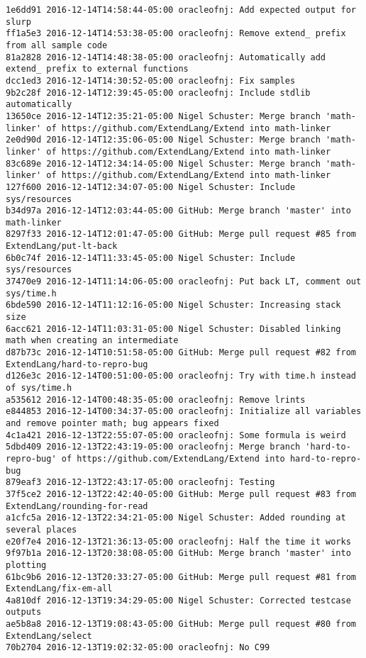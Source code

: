 \begin{lstlisting}
1e6dd91 2016-12-14T14:58:44-05:00 oracleofnj: Add expected output for slurp
ff1a5e3 2016-12-14T14:53:38-05:00 oracleofnj: Remove extend_ prefix from all sample code
81a2828 2016-12-14T14:48:38-05:00 oracleofnj: Automatically add extend_ prefix to external functions
dcc1ed3 2016-12-14T14:30:52-05:00 oracleofnj: Fix samples
9b2c28f 2016-12-14T12:39:45-05:00 oracleofnj: Include stdlib automatically
13650ce 2016-12-14T12:35:21-05:00 Nigel Schuster: Merge branch 'math-linker' of https://github.com/ExtendLang/Extend into math-linker
2e0d90d 2016-12-14T12:35:06-05:00 Nigel Schuster: Merge branch 'math-linker' of https://github.com/ExtendLang/Extend into math-linker
83c689e 2016-12-14T12:34:14-05:00 Nigel Schuster: Merge branch 'math-linker' of https://github.com/ExtendLang/Extend into math-linker
127f600 2016-12-14T12:34:07-05:00 Nigel Schuster: Include sys/resources
b34d97a 2016-12-14T12:03:44-05:00 GitHub: Merge branch 'master' into math-linker
8297f33 2016-12-14T12:01:47-05:00 GitHub: Merge pull request #85 from ExtendLang/put-lt-back
6b0c74f 2016-12-14T11:33:45-05:00 Nigel Schuster: Include sys/resources
37470e9 2016-12-14T11:14:06-05:00 oracleofnj: Put back LT, comment out sys/time.h
6bde590 2016-12-14T11:12:16-05:00 Nigel Schuster: Increasing stack size
6acc621 2016-12-14T11:03:31-05:00 Nigel Schuster: Disabled linking math when creating an intermediate
d87b73c 2016-12-14T10:51:58-05:00 GitHub: Merge pull request #82 from ExtendLang/hard-to-repro-bug
d126e3c 2016-12-14T00:51:00-05:00 oracleofnj: Try with time.h instead of sys/time.h
a535612 2016-12-14T00:48:35-05:00 oracleofnj: Remove lrints
e844853 2016-12-14T00:34:37-05:00 oracleofnj: Initialize all variables and remove pointer math; bug appears fixed
4c1a421 2016-12-13T22:55:07-05:00 oracleofnj: Some formula is weird
5dbd409 2016-12-13T22:43:19-05:00 oracleofnj: Merge branch 'hard-to-repro-bug' of https://github.com/ExtendLang/Extend into hard-to-repro-bug
879eaf3 2016-12-13T22:43:17-05:00 oracleofnj: Testing
37f5ce2 2016-12-13T22:42:40-05:00 GitHub: Merge pull request #83 from ExtendLang/rounding-for-read
a1cfc5a 2016-12-13T22:34:21-05:00 Nigel Schuster: Added rounding at several places
e20f7e4 2016-12-13T21:36:13-05:00 oracleofnj: Half the time it works
9f97b1a 2016-12-13T20:38:08-05:00 GitHub: Merge branch 'master' into plotting
61bc9b6 2016-12-13T20:33:27-05:00 GitHub: Merge pull request #81 from ExtendLang/fix-em-all
4a810df 2016-12-13T19:34:29-05:00 Nigel Schuster: Corrected testcase outputs
ae5b8a8 2016-12-13T19:08:43-05:00 GitHub: Merge pull request #80 from ExtendLang/select
70b2704 2016-12-13T19:02:32-05:00 oracleofnj: No C99

\end{lstlisting}
